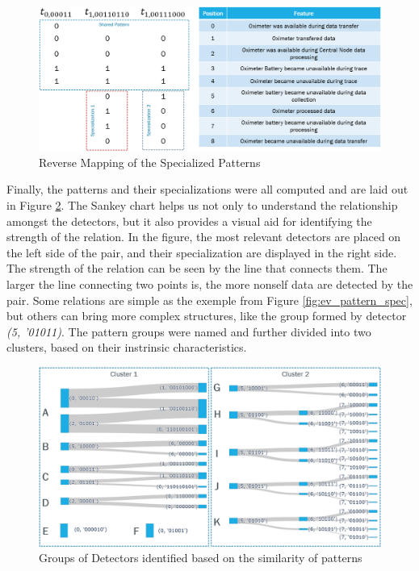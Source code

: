 \begin{figure}[!h]
	\centering
	\includegraphics[width=\textwidth, keepaspectratio]{img/pattern_specialization_reverse_map.png}
	\caption{Reverse Mapping of the Specialized Patterns}
	\label{fig:ev_pattern_spec_reverse_mapping}
\end{figure}


Finally, the patterns and their specializations were all computed and are laid out in Figure \ref{fig:ev_sankey}. The Sankey chart helps us not only to understand the relationship amongst the detectors, but it also provides a visual aid for identifying the strength of the relation. In the figure, the most relevant detectors are placed on the left side of the pair, and their specialization are displayed in the right side. The strength of the relation can be seen by the line that connects them. The larger the line connecting two points is, the more nonself data are detected by the pair. Some relations are simple as the exemple from Figure \ref{fig:ev_pattern_spec}, but others can bring more complex structures, like the group formed by detector \textit{(5, '01011)}. The pattern groups were named and further divided into two clusters, based on their instrinsic characteristics.

\begin{figure}[]
	\centering
	\includegraphics[width=\textwidth, keepaspectratio]{img/sankey4.png}
	\caption{Groups of Detectors identified based on the similarity of patterns}
	\label{fig:ev_sankey}
\end{figure}

